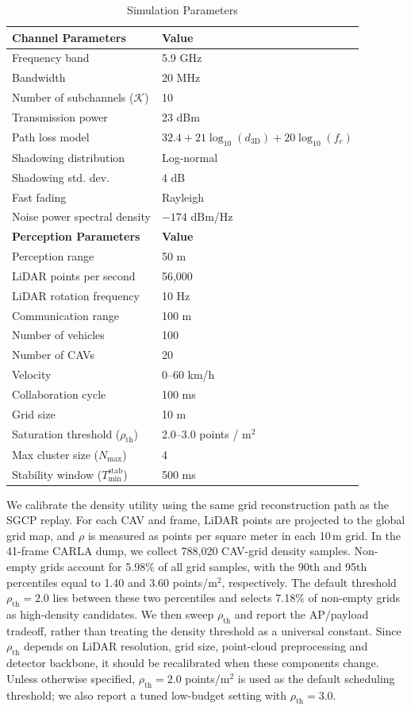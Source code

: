 \documentclass[conference]{IEEEtran}
\begin{document}
\begin{table}[htbp]
\centering
\caption{Simulation Parameters}
\label{tab:sim_params}
\begin{tabular}{|l|l|}
\hline
\textbf{Channel Parameters} & \textbf{Value} \\
\hline
Frequency band & 5.9 GHz \\
Bandwidth & 20 MHz \\
Number of subchannels ($\mathcal{K}$) & 10 \\
Transmission power & 23 dBm \\
Path loss model & $32.4 + 21 \log_{10}(d_{\text{3D}}) + 20 \log_{10}(f_c)$ \\
Shadowing distribution & Log-normal \\
Shadowing std. dev. & 4 dB \\
Fast fading & Rayleigh \\
Noise power spectral density & $-174$ dBm/Hz \\
\hline
\textbf{Perception Parameters} & \textbf{Value} \\
\hline
Perception range & 50 m \\
LiDAR points per second & 56,000 \\
LiDAR rotation frequency & 10 Hz \\
Communication range & 100 m \\
Number of vehicles & 100 \\
Number of CAVs & 20 \\
Velocity & 0–60 km/h \\
Collaboration cycle & 100 ms \\
Grid size & 10 m \\
Saturation threshold ($\rho_{\mathrm{th}}$) & 2.0--3.0 points / m$^2$ \\
Max cluster size ($N_{\max}$) & 4 \\
Stability window ($T_{\min}^{\mathrm{stab}}$) & 500 ms \\
\hline 
\end{tabular}
\end{table}

We calibrate the density utility using the same grid reconstruction path as the SGCP replay. For each CAV and frame, LiDAR points are projected to the global grid map, and $\rho$ is measured as points per square meter in each 10\,m grid. In the 41-frame CARLA dump, we collect 788,020 CAV-grid density samples. Non-empty grids account for 5.98\% of all grid samples, with the 90th and 95th percentiles equal to 1.40 and 3.60 points/m$^2$, respectively. The default threshold $\rho_{\mathrm{th}}=2.0$ lies between these two percentiles and selects 7.18\% of non-empty grids as high-density candidates. We then sweep $\rho_{\mathrm{th}}$ and report the AP/payload tradeoff, rather than treating the density threshold as a universal constant. Since $\rho_{\mathrm{th}}$ depends on LiDAR resolution, grid size, point-cloud preprocessing and detector backbone, it should be recalibrated when these components change. Unless otherwise specified, $\rho_{\mathrm{th}}=2.0$ points/m$^2$ is used as the default scheduling threshold; we also report a tuned low-budget setting with $\rho_{\mathrm{th}}=3.0$.
\end{document}

